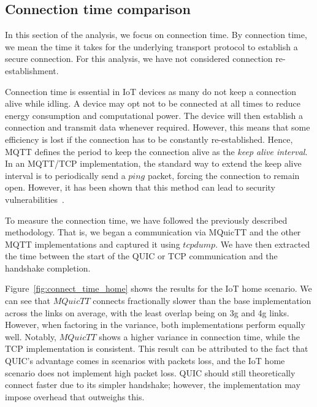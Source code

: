 \subsection{Connection time comparison} \label{sec:conn_time}

In this section of the analysis, we focus on connection time.
By connection time, we mean the time it takes for the underlying transport protocol to establish a secure connection.
For this analysis, we have not considered connection re-establishment.

Connection time is essential in IoT devices as many do not keep a connection alive while idling.
A device may opt not to be connected at all times to reduce energy consumption and computational power.
The device will then establish a connection and transmit data whenever required.
However, this means that some efficiency is lost if the connection has to be constantly re-established.
Hence, MQTT defines the period to keep the connection alive as the \textit{keep alive interval}.
In an MQTT/TCP implementation, the standard way to extend the keep alive interval is to periodically send a $ping$ packet, forcing the connection to remain open.
However, it has been shown that this method can lead to security vulnerabilities~\citep{vaccari_slowtt_2020,mileva_comprehensive_2021}.

To measure the connection time, we have followed the previously described methodology.
That is, we began a communication via MQuicTT and the other MQTT implementations and captured it using $tcpdump$.
We have then extracted the time between the start of the QUIC or TCP communication and the handshake completion.

Figure~\ref{fig:connect_time_home} shows the results for the IoT home scenario.
We can see that $MQuicTT$ connects fractionally slower than the base implementation across the links on average, with the least overlap being on 3g and 4g links.
However, when factoring in the variance, both implementations perform equally well.
Notably, $MQuicTT$ shows a higher variance in connection time, while the TCP implementation is consistent.
This result can be attributed to the fact that QUIC's advantage comes in scenarios with packets loss, and the IoT home scenario does not implement high packet loss.
QUIC should still theoretically connect faster due to its simpler handshake; however, the implementation may impose overhead that outweighs this.


